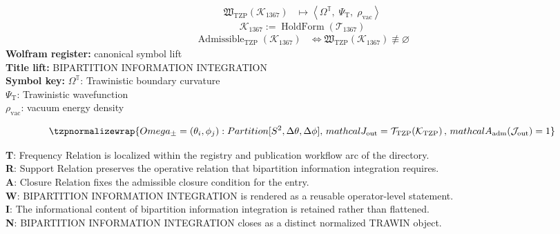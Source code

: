 \noindent
\begin{minipage}[t]{0.48\linewidth}
\begingroup
\small
\[
\begin{aligned}
\mathfrak{W}_{\mathrm{TZP}}\!\left(\mathcal{K}_{1367}\right)
&\longmapsto
\left\langle \Omega^{\mathbb{T}},\; \Psi_{\mathrm{T}},\; \rho_{\mathrm{vac}} \right\rangle
\end{aligned}
\]
\[
\mathcal{K}_{1367}
:=
\operatorname{HoldForm}\!\left(\mathcal{T}_{1367}\right)
\]
\[
\begin{aligned}
\operatorname{Admissible}_{\mathrm{TZP}}\!\left(\mathcal{K}_{1367}\right)
&\Longleftrightarrow
\mathfrak{W}_{\mathrm{TZP}}\!\left(\mathcal{K}_{1367}\right)\not\equiv\varnothing
\end{aligned}
\]
\textbf{Wolfram register:} canonical symbol lift\\
\textbf{Title lift:} BIPARTITION INFORMATION INTEGRATION\\
\textbf{Symbol key:} \(\Omega^{\mathbb{T}}\): Trawinistic boundary curvature\\ \(\Psi_{\mathrm{T}}\): Trawinistic wavefunction\\ \(\rho_{\mathrm{vac}}\): vacuum energy density
\par
\endgroup
\end{minipage}\hfill
\begin{minipage}[t]{0.48\linewidth}
\[
\tzpnormalizewrap{Omega_\pm = {(\theta_i, \phi_j) : Partition[S\textsuperscript{2}, {\Delta\theta, \Delta\phi}]},\,mathcal{J}_{\mathrm{out}} = \mathcal{T}_{\mathrm{TZP}}\!\left(\mathcal{K}_{\mathrm{TZP}}\right),\,mathcal{A}_{\mathrm{adm}}\!\left(\mathcal{J}_{\mathrm{out}}\right)=1}
\]

\small
\textbf{T}: Frequency Relation is localized within the registry and publication workflow arc of the directory.\\
\textbf{R}: Support Relation preserves the operative relation that bipartition information integration requires.\\
\textbf{A}: Closure Relation fixes the admissible closure condition for the entry.\\
\textbf{W}: BIPARTITION INFORMATION INTEGRATION is rendered as a reusable operator-level statement.\\
\textbf{I}: The informational content of bipartition information integration is retained rather than flattened.\\
\textbf{N}: BIPARTITION INFORMATION INTEGRATION closes as a distinct normalized TRAWIN object.
\normalsize
\end{minipage}

